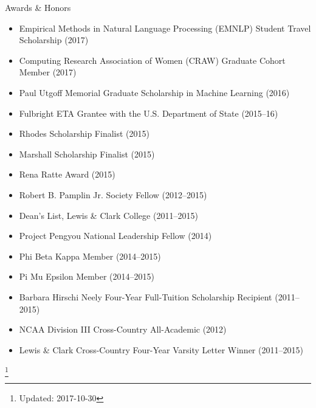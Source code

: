 \documentclass{resume} %
\newcommand\blfootnote[1]{%
  \begingroup
  \renewcommand\thefootnote{}\footnote{#1}%
  \addtocounter{footnote}{-1}%
  \endgroup
}
\begin{document}

\begin{rSection}{Awards \& Honors}
\begin{itemize}
\item Empirical Methods in Natural Language Processing (EMNLP) Student Travel Scholarship (2017)
\item Computing Research Association of Women (CRAW) Graduate Cohort Member (2017) 
\item Paul Utgoff Memorial Graduate Scholarship in Machine Learning (2016) 
\item Fulbright ETA Grantee with the U.S. Department of State (2015--16)
\item Rhodes Scholarship Finalist (2015) 
\item Marshall Scholarship Finalist (2015) 
\item Rena Ratte Award (2015) 
\item Robert B. Pamplin Jr. Society Fellow (2012--2015)
\item Dean's List, Lewis \& Clark College (2011--2015)
\item Project Pengyou National Leadership Fellow (2014) 
\item Phi Beta Kappa Member (2014--2015)
\item Pi Mu Epsilon Member (2014--2015)
\item Barbara Hirschi Neely Four-Year Full-Tuition Scholarship Recipient (2011--2015)
\item NCAA Division III Cross-Country All-Academic (2012) 
\item Lewis \& Clark Cross-Country Four-Year Varsity Letter Winner (2011--2015)
\end{itemize} 

\end{rSection}

\blfootnote{Updated: 2017-10-30}

\bigskip
\end{document}
